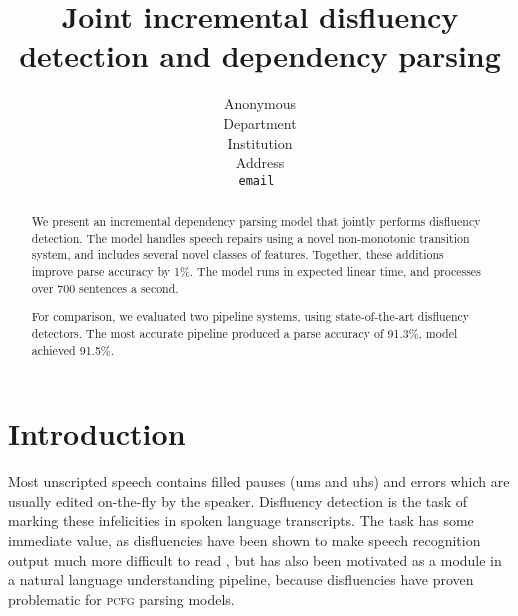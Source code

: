 \documentclass[11pt,letterpaper]{article}
\title{Joint incremental disfluency detection and dependency parsing}
\author{
	Anonymous\\
  	Department\\
  	Institution\\
  	Address\\
  {\tt \small email }\\
}
\date{}
\newcommand{\pcfg}{\textsc{pcfg}\xspace}
\begin{document}
\maketitle
\begin{abstract}

We present an incremental dependency parsing model that jointly performs
disfluency detection.  The model handles speech repairs using a novel non-monotonic
transition system, and includes several novel classes of features.  Together, these
additions improve parse accuracy by 1\%.  The model runs in expected linear time,
and processes over 700 sentences a second.

For comparison, we evaluated two pipeline systems, using state-of-the-art disfluency
detectors.  The most accurate pipeline produced a parse accuracy of 91.3\%,
model achieved 91.5\%.


\end{abstract}

\section{Introduction}

Most unscripted speech contains filled pauses (ums and uhs) and errors which are
usually edited on-the-fly by the speaker. Disfluency detection is the task of
marking these infelicities in spoken language transcripts. The task has some
immediate value, as disfluencies have been shown to make speech recognition output
much more difficult to read \citep{jones:03}, but has also been motivated as
a module in a natural language understanding pipeline, because disfluencies have
proven problematic for \pcfg parsing models.


\end{document}
